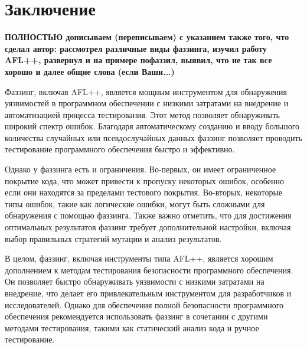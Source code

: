 \chapter*{Заключение} \label{ch-conclusion}

\textbf{ПОЛНОСТЬЮ дописываем (переписываем) с указанием также того, что сделал автор: рассмотрел различные виды фаззинга, изучил работу AFL++, развернул и на примере пофаззил, выявил, что не так все хорошо и далее общие слова (если Ваши...)}


Фаззинг, включая AFL++, является мощным инструментом для обнаружения уязвимостей в программном обеспечении с низкими затратами на внедрение и автоматизацией процесса тестирования. Этот метод позволяет обнаруживать широкий спектр ошибок. Благодаря автоматическому созданию и вводу большого количества случайных или псевдослучайных данных фаззинг позволяет проводить тестирование программного обеспечения быстро и эффективно.

Однако у фаззинга есть и ограничения. Во-первых, он имеет ограниченное покрытие кода, что может привести к пропуску некоторых ошибок, особенно если они находятся за пределами тестового покрытия. Во-вторых, некоторые типы ошибок, такие как логические ошибки, могут быть сложными для обнаружения с помощью фаззинга. Также важно отметить, что для достижения оптимальных результатов фаззинг требует дополнительной настройки, включая выбор правильных стратегий мутации и анализ результатов.

В целом, фаззинг, включая инструменты типа AFL++, является хорошим  дополнением к методам тестирования безопасности программного обеспечения. Он позволяет быстро обнаруживать уязвимости с низкими затратами на внедрение, что делает его привлекательным инструментом для разработчиков и исследователей. Однако для обеспечения полной безопасности программного обеспечения рекомендуется использовать фаззинг в сочетании с другими методами тестирования, такими как статический анализ кода и ручное тестирование.
